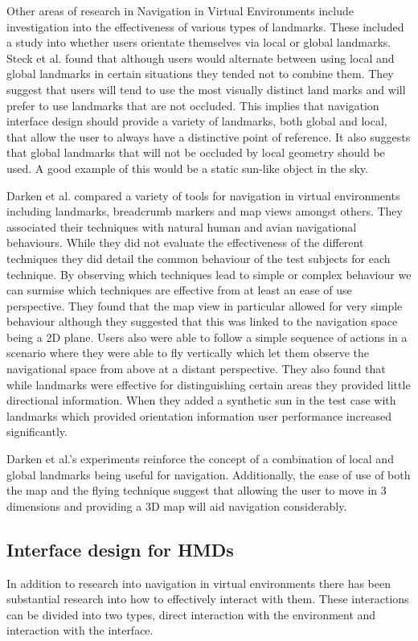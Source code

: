 \documentclass{sig-alternate-05-2015}
\begin{document}
Other areas of research in Navigation in Virtual Environments include investigation into the effectiveness of various types of landmarks. These included a study into whether users orientate themselves via local or global landmarks\cite{Steck2000}. Steck et al. found that although users would alternate between using local and global landmarks in certain situations they tended not to combine them. They suggest that users will tend to use the most visually distinct land marks and will prefer to use landmarks that are not occluded. This implies that navigation interface design should provide a variety of landmarks, both global and local, that allow the user to always have a distinctive point of reference. It also suggests that global landmarks that will not be occluded by local geometry should be used. A good example of this would be a static sun-like object in the sky.

Darken et al. compared a variety of tools for navigation in virtual environments including landmarks, breadcrumb markers and map views amongst others\cite{Darken1993}. They associated their techniques with natural human and avian  navigational behaviours. While they did not evaluate the effectiveness of the different techniques they did detail the common behaviour of the test subjects for each technique. By observing which techniques lead to simple or complex behaviour we can surmise which techniques are effective from at least an ease of use perspective. They found that the map view in particular allowed for very simple behaviour although they suggested that this was linked to the navigation space being a 2D plane. Users also were able to follow a simple sequence of actions in a scenario where they were able to fly vertically which let them observe the navigational space from above at a distant perspective. They also found that while landmarks were effective for distinguishing certain areas they provided little directional information. When they added a synthetic sun in the test case with landmarks which provided orientation information user performance increased significantly.

Darken et al.'s experiments reinforce the concept of a combination of local and global landmarks being useful for navigation. Additionally, the ease of use of both the map and the flying technique suggest that allowing the user to move in 3 dimensions and providing a 3D map will aid navigation considerably. 
\subsection{Interface design for HMDs}
In addition to research into navigation in virtual environments there has been substantial research into how to effectively interact with them. These interactions can be divided into two types, direct interaction with the environment and interaction with the interface.
\end{document}
